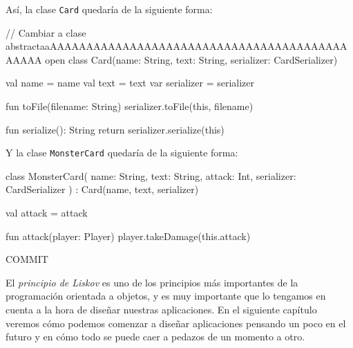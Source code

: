   Así, la clase \texttt{Card} quedaría de la siguiente forma:

  \begin{kotlin}
    // Cambiar a clase abstractaaAAAAAAAAAAAAAAAAAAAAAAAAAAAAAAAAAAAAAAAAAAAAAA
    open class Card(name: String, text: String, serializer: CardSerializer) {
      val name = name
      val text = text
      var serializer = serializer

      fun toFile(filename: String) {
        serializer.toFile(this, filename)
      }

      fun serialize(): String {
        return serializer.serialize(this)
      }
    }
  \end{kotlin}

  Y la clase \texttt{MonsterCard} quedaría de la siguiente forma:

  \begin{kotlin}
    class MonsterCard(
      name: String,
      text: String,
      attack: Int,
      serializer: CardSerializer
    ) : Card(name, text, serializer) {
      val attack = attack
      
      fun attack(player: Player) {
        player.takeDamage(this.attack)
      }
    }
  \end{kotlin}

  COMMIT
  
  El \textit{principio de Liskov} es uno de los principios más importantes de la programación 
  orientada a objetos, y es muy importante que lo tengamos en cuenta a la hora de diseñar nuestras
  aplicaciones.
  En el siguiente capítulo veremos cómo podemos comenzar a diseñar aplicaciones pensando un poco en
  el futuro y en cómo todo se puede caer a pedazos de un momento a otro.
